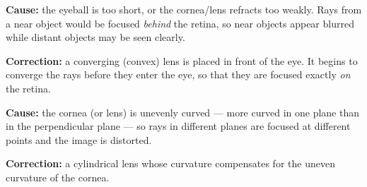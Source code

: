 \documentclass[11pt]{article}
\newcommand{\cle}[1]{{\popxbold\color{popdark}#1}}
\begin{document}
\begin{propriete}
\textbf{Cause:} the eyeball is too short, or the cornea/lens refracts too weakly. Rays from a near object would be focused \emph{behind} the retina, so near objects appear blurred while distant objects may be seen clearly.\par
\textbf{Correction:} a \cle{converging (convex) lens} is placed in front of the eye. It begins to converge the rays before they enter the eye, so that they are focused exactly \emph{on} the retina.
\end{propriete}

\begin{propriete}[Astigmatism]
\textbf{Cause:} the cornea (or lens) is unevenly curved --- more curved in one plane than in the perpendicular plane --- so rays in different planes are focused at different points and the image is distorted.\par
\textbf{Correction:} a \cle{cylindrical lens} whose curvature compensates for the uneven curvature of the cornea.
\end{propriete}
\end{document}
